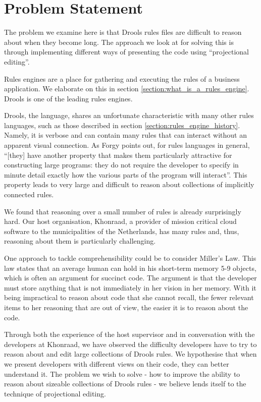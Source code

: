 \section{Problem Statement}
\label{section:problem_statement}

The problem we examine here is that Drools rules files are difficult to reason about when they become long.
The approach we look at for solving this is through implementing different ways of presenting the code using ``projectional editing''.

Rules engines are a place for gathering and executing the rules of a business application.
We elaborate on this in section \ref{section:what_is_a_rules_engine}.
Drools is one of the leading rules engines.

Drools, the language, shares an unfortunate characteristic with many other rules languages, such as those described in section \ref{section:rules_engine_history}.
Namely, it is verbose and can contain many rules that can interact without an apparent visual connection.
As Forgy\cite{forgy1989rete} points out, for rules languages in general, ``[they] have another property that makes them particularly attractive for constructing large programs: they do not require the developer to specify in minute detail exactly how the various parts of the program will interact''.
This property leads to very large and difficult to reason about collections of implicitly connected rules.

We found that reasoning over a small number of rules is already surprisingly hard.
Our host organisation, Khonraad, a provider of mission critical cloud software to the municipalities of the Netherlands, has many rules and, thus, reasoning about them is particularly challenging.

One approach to tackle comprehensibility could be to consider Miller's Law\cite{miller1956magical}.
This law states that an average human can hold in his short-term memory 5-9 objects, which is often an argument for succinct code.
The argument is that the developer must store anything that is not immediately in her vision in her memory.
With it being impractical to reason about code that she cannot recall, the fewer relevant items to her reasoning that are out of view, the easier it is to reason about the code.

Through both the experience of the host supervisor and in conversation with the developers at Khonraad, we have observed the difficulty developers have to try to reason about and edit large collections of Drools rules.
We hypothesise that when we present developers with different views on their code, they can better understand it.
The problem we wish to solve - how to improve the ability to reason about sizeable collections of Drools rules - we believe lends itself to the technique of projectional editing.

